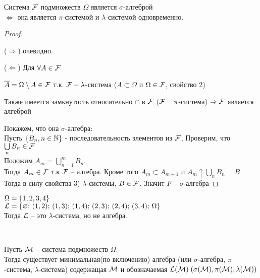 
\begin{lemma}
	Система $\mathcal{F}$ подмножеств $\Omega$ является $\sigma$-алгеброй \\
	$\Leftrightarrow$ она является $\pi$-системой и $\lambda$-системой одновременно.
	
	\begin{proof}~

		($\Rightarrow$) очевидно.

		($\Leftarrow$) Для $\forall A \in \mathcal{F}$

		$\overline{A} = \Omega \setminus A \in \mathcal{F}$ т.к. $\mathcal{F} - \lambda$-система ($A \subset \Omega$ и $\Omega \in \mathcal{F}$, свойство 2)
		
		Также имеется замкнутость относительно $\cap$ в $\mathcal{F}$ 
		($\mathcal{F} - \pi$-система) $\Rightarrow \mathcal{F}$ является алгеброй

		Покажем, что она $\sigma$-алгебра:\\
		Пусть $\left\{  B_n, n \in \mathbb{N}  \right\}$ - последовательность элементов из $\mathcal{F}$, 
		Проверим, что $\bigcup\limits_{n} B_n \in \mathcal{F}$\\
		
		Положим $A_m = \bigcup\limits_{n = 1}^{m} B_n$. \\
		Тогда $A_m \in \mathcal{F}$ т.к $\mathcal{F}$ -- алгебра. Кроме того $A_m \subset A_{m + 1}$ и
		$A_m \uparrow \bigcup\limits_n B_n = B$ \\
		
		Тогда в силу свойства 3) $\lambda$-системы, $B \in \mathcal{F}$. Значит $F$ -- $\sigma$-алгебра
		
	\end{proof}
\end{lemma}

\begin{example}
	$\Omega = \left\{  1, 2, 3, 4  \right\}$\\
	$\mathcal{L} = \left\{  \varnothing;\, (1, 2);\, (1, 3);\, 
	(1, 4);\, (2, 3);\, (2, 4);\, (3, 4);\, \Omega  \right\}$\\
	Тогда $\mathcal{L}$ -- это $\lambda$-система, но не алгебра.
\end{example}

\begin{lemma}~

	Пусть $\mathcal{M}$ -- система подмножеств $\Omega$.\\
	Тогда существует минимальная(по включению) алгебра 
	(или $\sigma$-алгебра, $\pi$-система, $\lambda$-система) содержащая $\mathcal{M}$ и обозначаемая
	$\mathcal{L}(\mathcal{M})\; (\sigma(\mathcal{M}), \pi(\mathcal{M}), \lambda(\mathcal{M}))$
\end{lemma}

